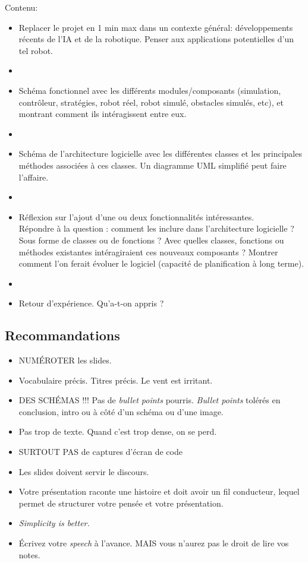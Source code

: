 \documentclass[a4paper,12pt]{article}
\begin{document}
Contenu:
\vspace{0.2cm}
\begin{itemize}
\item[$\ast$] Replacer le projet en 1 min max dans un contexte général:
développements récents de l'IA et de la robotique.
Penser aux applications potentielles d'un tel robot.
\item[$ $]
\item[$\ast$] Schéma fonctionnel avec les différents modules/composants
(simulation, contrôleur, stratégies, robot réel, robot simulé, obstacles simulés, etc),
et montrant comment ils intéragissent entre eux.
\item[$ $]
\item[$\ast$] Schéma de l'architecture logicielle avec les différentes classes
et les principales méthodes associées à ces classes.
Un diagramme UML simplifié peut faire l'affaire.
\item[$ $]
\item[$\ast$] Réflexion sur l'ajout d'une ou deux fonctionnalités intéressantes.\\
Répondre à la question : comment les inclure dans l'architecture logicielle ? Sous forme de classes
ou de fonctions ? Avec quelles classes, fonctions ou méthodes existantes intéragiraient ces nouveaux 
composants ? Montrer comment l'on ferait évoluer le logiciel (capacité de planification à long terme).
\item[$ $]
\item[$\ast$] Retour d'expérience. Qu'a-t-on appris ?
\end{itemize}


\subsection{Recommandations}

\begin{itemize}
\item[$\ast$] NUMÉROTER les slides.
\item[$\ast$] Vocabulaire précis. Titres précis. Le vent est irritant.
\item[$\ast$] DES SCHÉMAS !!! Pas de \textit{bullet points} pourris. 
\textit{Bullet points} tolérés en conclusion, intro ou à côté d'un schéma ou d'une image.
\item[$\ast$] Pas trop de texte. Quand c'est trop dense, on se perd.
\item[$\ast$] SURTOUT PAS de captures d'écran de code
\item[$\ast$] Les slides doivent servir le discours.
\item[$\ast$] Votre présentation raconte une histoire et doit avoir un 
fil conducteur, lequel permet de structurer votre pensée et votre présentation.
\item[$\ast$] \textit{Simplicity is better.}
\item[$\ast$] Écrivez votre \textit{speech} à l'avance. 
MAIS vous n'aurez pas le droit de lire vos notes.
\end{itemize}
\end{document}
